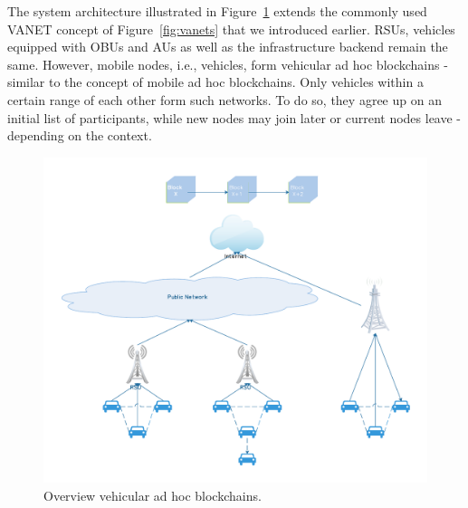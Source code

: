 \documentclass{llncs}
\begin{document}
{			The system architecture illustrated in Figure~\ref{fig:architecture-overview} extends the commonly used VANET concept of Figure~\ref{fig:vanets} that we introduced earlier. RSUs, vehicles equipped with OBUs and AUs as well as the infrastructure backend remain the same. However, mobile nodes, i.e., vehicles, form vehicular ad hoc blockchains - similar to the concept of mobile ad hoc blockchains. Only vehicles within a certain range of each other form such networks. To do so, they agree up on an initial list of participants, while new nodes may join later or current nodes leave - depending on the context.		
			\begin{figure}[H]
				\centering
				\includegraphics[scale=0.5]{Figures/20180904_monet-vanet.pdf}
				\caption{Overview vehicular ad hoc blockchains.}
				\label{fig:architecture-overview}
			\end{figure}
}
\end{document}
